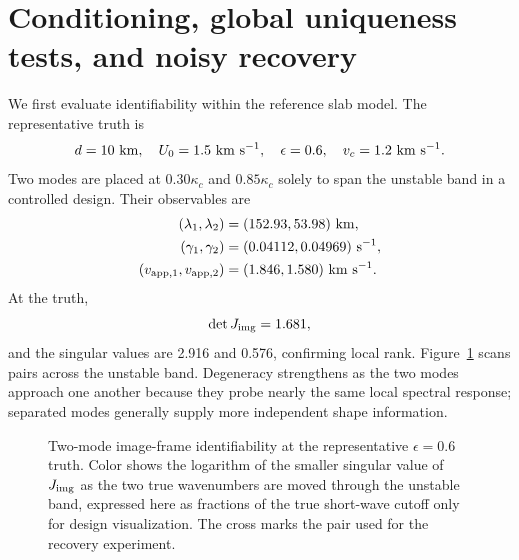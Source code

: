 \documentclass[linenumbers]{aastex7}
\begin{document}
\section{Conditioning, global uniqueness tests, and noisy recovery}
We first evaluate identifiability within the reference slab model. The representative truth is
\begin{equation}
d=10~{\rm km},\quad U_0=1.5~{\rm km~s^{-1}},\quad
\epsilon=0.6,\quad v_c=1.2~{\rm km~s^{-1}}.
\end{equation}
Two modes are placed at $0.30\kappa_c$ and $0.85\kappa_c$ solely to span the unstable band in a controlled design. Their observables are
\begin{align}
(\lambda_1,\lambda_2)&=(152.93,53.98)~{\rm km},\\
(\gamma_1,\gamma_2)&=(0.04112,0.04969)~{\rm s^{-1}},\\
(v_{{\rm app},1},v_{{\rm app},2})&=(1.846,1.580)~{\rm km~s^{-1}}.
\end{align}
At the truth,
\begin{equation}
\det J_{\rm img}=1.681,
\end{equation}
and the singular values are 2.916 and 0.576, confirming local rank. Figure~\ref{fig:image-ident} scans pairs across the unstable band. Degeneracy strengthens as the two modes approach one another because they probe nearly the same local spectral response; separated modes generally supply more independent shape information.

\begin{figure}
\caption{Two-mode image-frame identifiability at the representative $\epsilon=0.6$ truth. Color shows the logarithm of the smaller singular value of $J_{\rm img}$ as the two true wavenumbers are moved through the unstable band, expressed here as fractions of the true short-wave cutoff only for design visualization. The cross marks the pair used for the recovery experiment.}
\label{fig:image-ident}
\end{figure}
\end{document}
